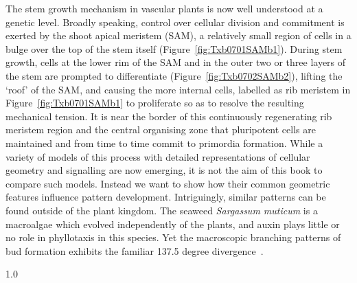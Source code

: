 The stem growth mechanism in vascular plants is now well understood at a genetic level. Broadly speaking, control over cellular division and commitment is exerted by the shoot apical meristem (SAM), a relatively small region of cells in a bulge over the top of the stem itself (Figure~\ref{fig:Txb0701SAMb1}). During stem growth, cells at the lower rim of the SAM and in the outer two or three layers of the stem are prompted to differentiate (Figure~\ref{fig:Txb0702SAMb2}), lifting the `roof' of the SAM, and causing the more internal cells, labelled as rib meristem in Figure~\ref{fig:Txb0701SAMb1} to proliferate so as to resolve the resulting mechanical tension. It is near the border of this continuously regenerating rib meristem region and the central organising zone that pluripotent cells are maintained and from time to time commit to primordia formation. While a variety of models of this process with detailed representations of cellular geometry and signalling are now emerging,  it is not the aim of this book to compare such models. Instead we want to show how their common geometric features influence pattern development. Intriguingly, similar  patterns can be found outside of the plant kingdom. The seaweed \textit{Sargassum muticum} is a macroalgae which evolved independently of the plants, and auxin plays little or no role in phyllotaxis in this species. Yet the macroscopic branching patterns of bud formation exhibits the familiar 137.5 degree divergence~\cite{linardicUnderstandingSpiralPatterning2017}. 

%
{1.0}





